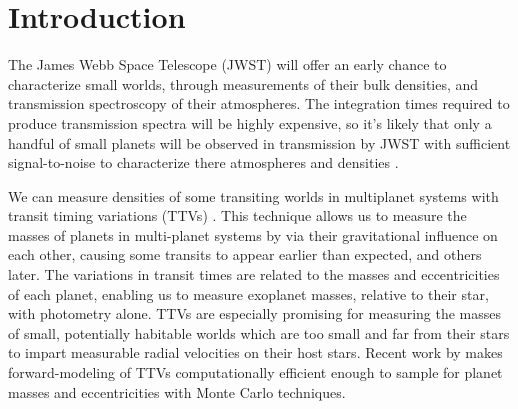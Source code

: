 %
%
%
%
\section{Introduction}

The James Webb Space Telescope (JWST) will offer an early chance to characterize small worlds, through measurements of their bulk densities, and transmission spectroscopy of their atmospheres. The integration times required to produce transmission spectra will be highly expensive, so it's likely that only a handful of small planets will be observed in transmission by JWST with sufficient signal-to-noise to characterize there atmospheres and densities \citep{Cowan2015}.

We can measure densities of some transiting worlds in multiplanet systems with transit timing variations (TTVs) \citep{Agol2005, Holman2005}. This technique allows us to measure the masses of planets in multi-planet systems by via their gravitational influence on each other, causing some transits to appear earlier than expected, and others later. The  variations in transit times are related to the masses and eccentricities of each planet, enabling us to measure exoplanet masses, relative to their star, with photometry alone. TTVs are especially promising for measuring the masses of small, potentially habitable worlds which are too small and far from their stars to impart measurable radial velocities on their host stars. Recent work by \citet{Deck2014, Agol2016a, Agol2016b} makes forward-modeling of TTVs computationally efficient enough to sample for planet masses and eccentricities with Monte Carlo techniques. 

